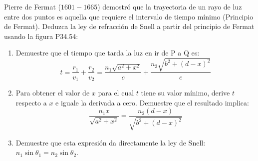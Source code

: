 \item Pierre de Fermat ($1601-1665$) demostró que la trayectoria de un rayo de luz entre dos puntos es aquella que requiere el intervalo de tiempo mínimo (Principio de Fermat). Deduzca la ley de refracción de Snell a partir del principio de Fermat usando la figura P34.54:
\begin{enumerate}
    \item Demuestre que el tiempo que tarda la luz en ir de P a Q es:
    $$ t = \frac{r_1}{v_1} + \frac{r_2}{v_2} = \frac{n_1 \sqrt{a^2 + x^2}}{c} + \frac{n_2 \sqrt{b^2 + (d - x)^2}}{c} $$
    \item Para obtener el valor de $x$ para el cual $t$ tiene su valor mínimo, derive $t$ respecto a $x$ e iguale la derivada a cero. Demuestre que el resultado implica:
    $$ \frac{n_1 x}{\sqrt{a^2 + x^2}} = \frac{n_2 (d - x)}{\sqrt{b^2 + (d - x)^2}} $$
    \item Demuestre que esta expresión da directamente la ley de Snell: $n_1 \sin\theta_1 = n_2 \sin\theta_2$.
\end{enumerate}
